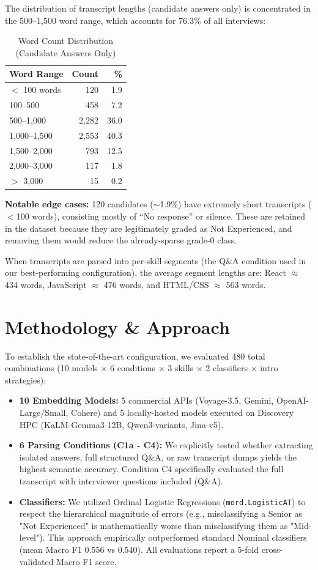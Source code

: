 \documentclass[11pt]{article}
\begin{document}
The distribution of transcript lengths (candidate answers only) is concentrated in the 500--1,500 word range, which accounts for 76.3\% of all interviews:

\begin{table}[htbp]
\centering
\caption{Word Count Distribution (Candidate Answers Only)}
\begin{tabular}{lrr}
\toprule
\textbf{Word Range} & \textbf{Count} & \textbf{\%} \\
\midrule
$<$ 100 words & 120 & 1.9 \\
100--500 & 458 & 7.2 \\
500--1,000 & 2,282 & 36.0 \\
1,000--1,500 & 2,553 & 40.3 \\
1,500--2,000 & 793 & 12.5 \\
2,000--3,000 & 117 & 1.8 \\
$>$ 3,000 & 15 & 0.2 \\
\bottomrule
\end{tabular}
\end{table}

\textbf{Notable edge cases:} 120 candidates ($\sim$1.9\%) have extremely short transcripts ($<$100 words), consisting mostly of ``No response'' or silence. These are retained in the dataset because they are legitimately graded as Not Experienced, and removing them would reduce the already-sparse grade-0 class.

When transcripts are parsed into per-skill segments (the Q\&A condition used in our best-performing configuration), the average segment lengths are: React $\approx$ 434 words, JavaScript $\approx$ 476 words, and HTML/CSS $\approx$ 563 words.

\section{Methodology \& Approach}

To establish the state-of-the-art configuration, we evaluated 480 total combinations (10 models $\times$ 6 conditions $\times$ 3 skills $\times$ 2 classifiers $\times$ intro strategies):
\begin{itemize}
    \item \textbf{10 Embedding Models:} 5 commercial APIs (Voyage-3.5, Gemini, OpenAI-Large/Small, Cohere) and 5 locally-hosted models executed on Discovery HPC (KaLM-Gemma3-12B, Qwen3-variants, Jina-v5).
    \item \textbf{6 Parsing Conditions (C1a - C4):} We explicitly tested whether extracting isolated answers, full structured Q\&A, or raw transcript dumps yields the highest semantic accuracy. Condition C4 specifically evaluated the full transcript with interviewer questions included (Q\&A).
    \item \textbf{Classifiers:} We utilized Ordinal Logistic Regressions (\texttt{mord.LogisticAT}) to respect the hierarchical magnitude of errors (e.g., misclassifying a Senior as "Not Experienced" is mathematically worse than misclassifying them as "Mid-level"). This approach empirically outperformed standard Nominal classifiers (mean Macro F1 0.556 vs 0.540). All evaluations report a 5-fold cross-validated Macro F1 score.
\end{itemize}
\end{document}
